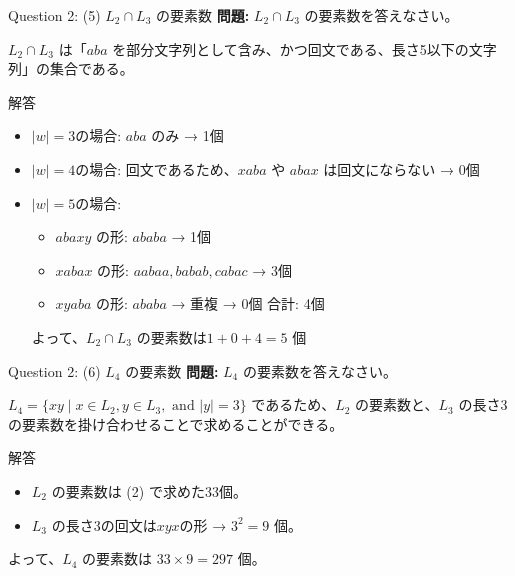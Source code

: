 \begin{frame}{Question 2: (5) $L_2 \cap L_3$ の要素数}
  \textbf{問題:} $L_2 \cap L_3$ の要素数を答えなさい。
  
  \vspace{1em}
  $L_2 \cap L_3$ は「$aba$ を部分文字列として含み、かつ回文である、長さ5以下の文字列」の集合である。

  \begin{alertblock}{解答}
    \begin{itemize}
      \item $|w| = 3$の場合: $aba$ のみ → 1個
      \item $|w| = 4$の場合: 回文であるため、$xaba$ や $abax$ は回文にならない → 0個
      \item $|w| = 5$の場合: 
      \begin{itemize}
        \item $abaxy$ の形: $ababa$ → 1個
        \item $xabax$ の形: $aabaa, babab, cabac$ → 3個
        \item $xyaba$ の形: $ababa$ → 重複 → 0個 
        合計: 4個
      \end{itemize}
      よって、$L_2 \cap L_3$ の要素数は$1 + 0 + 4 = 5$ 個
    \end{itemize}
  \end{alertblock}
\end{frame}

\begin{frame}{Question 2: (6) $L_4$ の要素数}
  \textbf{問題:} $L_4$ の要素数を答えなさい。
  
  \vspace{1em}
  $L_4 = \{xy \mid x \in L_2, y \in L_3, \text{ and } |y| = 3\}$ であるため、$L_2$ の要素数と、$L_3$ の長さ3の要素数を掛け合わせることで求めることができる。

  \begin{alertblock}{解答}
    \begin{itemize}
    \item $L_2$ の要素数は (2) で求めた33個。
    \item $L_3$ の長さ3の回文は$xyx$の形 → $3^2 = 9$ 個。
    \end{itemize}
    よって、$L_4$ の要素数は $33 \times 9 = 297$ 個。
   \end{alertblock}
\end{frame}